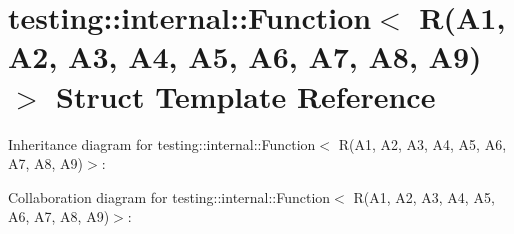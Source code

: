 \hypertarget{structtesting_1_1internal_1_1Function_3_01R_07A1_00_01A2_00_01A3_00_01A4_00_01A5_00_01A6_00_01A7_00_01A8_00_01A9_08_4}{}\section{testing\+:\+:internal\+:\+:Function$<$ R(A1, A2, A3, A4, A5, A6, A7, A8, A9)$>$ Struct Template Reference}
\label{structtesting_1_1internal_1_1Function_3_01R_07A1_00_01A2_00_01A3_00_01A4_00_01A5_00_01A6_00_01A7_00_01A8_00_01A9_08_4}


Inheritance diagram for testing\+:\+:internal\+:\+:Function$<$ R(A1, A2, A3, A4, A5, A6, A7, A8, A9)$>$\+:


Collaboration diagram for testing\+:\+:internal\+:\+:Function$<$ R(A1, A2, A3, A4, A5, A6, A7, A8, A9)$>$\+:
